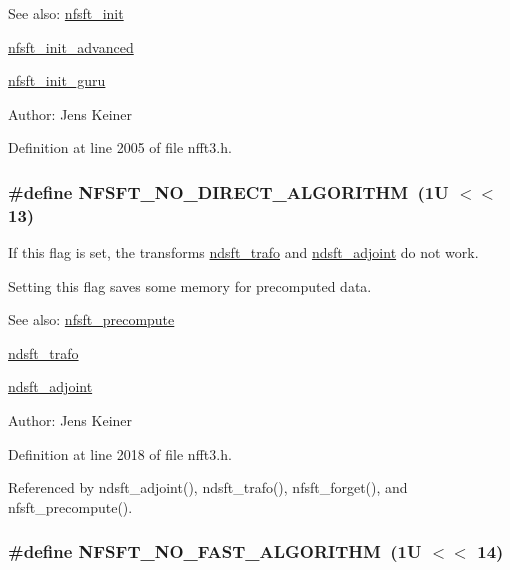 \begin{Desc}
\item[See also:]\hyperlink{group__nfsft_g65cda3f4a3edc5eb39c697cf34b1f0b9}{nfsft\_\-init} 

\hyperlink{group__nfsft_ge7dca3e41afdb39e8c518af414878c18}{nfsft\_\-init\_\-advanced} 

\hyperlink{group__nfsft_g60466ed37643b6b7b7c1638056604d2b}{nfsft\_\-init\_\-guru} \end{Desc}
\begin{Desc}
\item[Author:]Jens Keiner \end{Desc}


Definition at line 2005 of file nfft3.h.\hypertarget{group__nfsft_g9ed987164acf6e362ab2878506fbca95}{
\subsubsection{\setlength{\rightskip}{0pt plus 5cm}\#define NFSFT\_\-NO\_\-DIRECT\_\-ALGORITHM~(1U $<$$<$ 13)}}
\label{group__nfsft_g9ed987164acf6e362ab2878506fbca95}


If this flag is set, the transforms \hyperlink{group__nfsft_gc1bcdf551a0bf1b4a5890b87e583caf8}{ndsft\_\-trafo} and \hyperlink{group__nfsft_g88c7be3ead1c726a1d5b8b903952c527}{ndsft\_\-adjoint} do not work. 

Setting this flag saves some memory for precomputed data.

\begin{Desc}
\item[See also:]\hyperlink{group__nfsft_gbe87aeea1f7cfef9ae8febb16d702f3b}{nfsft\_\-precompute} 

\hyperlink{group__nfsft_gc1bcdf551a0bf1b4a5890b87e583caf8}{ndsft\_\-trafo} 

\hyperlink{group__nfsft_g88c7be3ead1c726a1d5b8b903952c527}{ndsft\_\-adjoint} \end{Desc}
\begin{Desc}
\item[Author:]Jens Keiner \end{Desc}


Definition at line 2018 of file nfft3.h.

Referenced by ndsft\_\-adjoint(), ndsft\_\-trafo(), nfsft\_\-forget(), and nfsft\_\-precompute().\hypertarget{group__nfsft_ga228bbed7ddbbb4a15f1cd11ec27b415}{
\subsubsection{\setlength{\rightskip}{0pt plus 5cm}\#define NFSFT\_\-NO\_\-FAST\_\-ALGORITHM~(1U $<$$<$ 14)}}
\label{group__nfsft_ga228bbed7ddbbb4a15f1cd11ec27b415}


